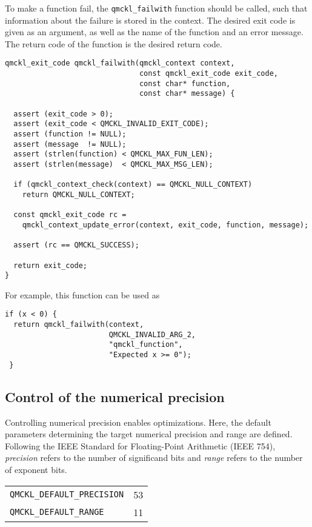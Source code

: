To make a function fail, the \texttt{qmckl\_failwith} function should be
called, such that information about the failure is stored in
the context. The desired exit code is given as an argument, as
well as the name of the function and an error message. The return
code of the function is the desired return code.

\begin{verbatim}
qmckl_exit_code qmckl_failwith(qmckl_context context,
                               const qmckl_exit_code exit_code,
                               const char* function,
                               const char* message) {

  assert (exit_code > 0);
  assert (exit_code < QMCKL_INVALID_EXIT_CODE);
  assert (function != NULL);
  assert (message  != NULL);
  assert (strlen(function) < QMCKL_MAX_FUN_LEN);
  assert (strlen(message)  < QMCKL_MAX_MSG_LEN);

  if (qmckl_context_check(context) == QMCKL_NULL_CONTEXT)
    return QMCKL_NULL_CONTEXT;
  
  const qmckl_exit_code rc = 
    qmckl_context_update_error(context, exit_code, function, message);

  assert (rc == QMCKL_SUCCESS);

  return exit_code;
}

\end{verbatim}

For example, this function can be used as
\begin{verbatim}
if (x < 0) {
  return qmckl_failwith(context,
                        QMCKL_INVALID_ARG_2,
                        "qmckl_function", 
                        "Expected x >= 0");
 }
\end{verbatim}

\subsection{Control of the numerical precision}
\label{sec:org7e9d10b}

Controlling numerical precision enables optimizations. Here, the
default parameters determining the target numerical precision and
range are defined. Following the IEEE Standard for Floating-Point
Arithmetic (IEEE 754),
\emph{precision} refers to the number of significand bits and \emph{range}
refers to the number of exponent bits.

\begin{table}[htbp]
\label{tab:orga45f0a8}
\centering
\begin{tabular}{lr}
\texttt{QMCKL\_DEFAULT\_PRECISION} & 53\\
\texttt{QMCKL\_DEFAULT\_RANGE} & 11\\
\end{tabular}
\end{table}

